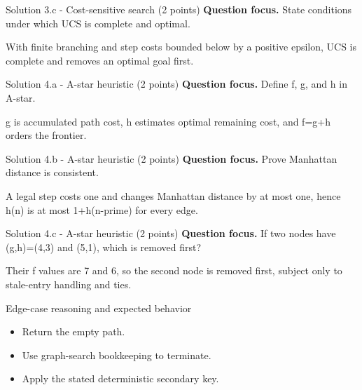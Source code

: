 \documentclass[aspectratio=169,11pt]{beamer}
\begin{document}
\begin{frame}{Solution 3.c - Cost-sensitive search (2 points)}
\small
\textbf{Question focus.} State conditions under which UCS is complete and optimal.

\vspace{0.25cm}
\answerlabel With finite branching and step costs bounded below by a positive epsilon, UCS is complete and removes an optimal goal first.
\end{frame}

\begin{frame}{Solution 4.a - A-star heuristic (2 points)}
\small
\textbf{Question focus.} Define f, g, and h in A-star.

\vspace{0.25cm}
\answerlabel g is accumulated path cost, h estimates optimal remaining cost, and f=g+h orders the frontier.
\end{frame}

\begin{frame}{Solution 4.b - A-star heuristic (2 points)}
\small
\textbf{Question focus.} Prove Manhattan distance is consistent.

\vspace{0.25cm}
\answerlabel A legal step costs one and changes Manhattan distance by at most one, hence h(n) is at most 1+h(n-prime) for every edge.
\end{frame}

\begin{frame}{Solution 4.c - A-star heuristic (2 points)}
\small
\textbf{Question focus.} If two nodes have (g,h)=(4,3) and (5,1), which is removed first?

\vspace{0.25cm}
\answerlabel Their f values are 7 and 6, so the second node is removed first, subject only to stale-entry handling and ties.
\end{frame}

\begin{frame}{Edge-case reasoning and expected behavior}
\small
\begin{itemize}
  \item Return the empty path.
  \item Use graph-search bookkeeping to terminate.
  \item Apply the stated deterministic secondary key.
\end{itemize}
\end{frame}
\end{document}
